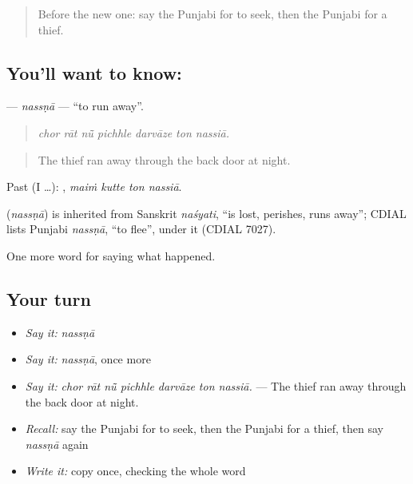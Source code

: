\label{lesson:PA-C311-nassna}



\begin{quote}
Before the new one: say the Punjabi for to seek, then the Punjabi for a thief.
\end{quote}

\subsection*{You'll want to know: }
\textbf{} — \emph{nassṇā} — \textquotedblleft{}to run away\textquotedblright{}.

\begin{quote}
      
\end{quote}

\begin{quote}
\emph{chor rāt nū̃ pichhle darvāze ton nassiā.}
\end{quote}

\begin{quote}
The thief ran away through the back door at night.
\end{quote}

Past (I …):    , \emph{maiṁ kutte ton nassiā}.

\begin{cousinweb}
\textbf{} (\emph{nassṇā}) is inherited from Sanskrit \emph{naśyati}, \textquotedblleft{}is lost, perishes, runs away\textquotedblright{}; CDIAL lists Punjabi \emph{nassṇā}, \textquotedblleft{}to flee\textquotedblright{}, under it (CDIAL 7027).
\end{cousinweb}

\begin{grammarlens}[title={What you've built}]
One more word for saying what happened.
\end{grammarlens}

\subsection*{Your turn}
\begin{itemize}
\raggedright
  \item \emph{Say it:} \emph{nassṇā}
  \item \emph{Say it:} \emph{nassṇā}, once more
  \item \emph{Say it:} \emph{chor rāt nū̃ pichhle darvāze ton nassiā.} — The thief ran away through the back door at night.
  \item \emph{Recall:} say the Punjabi for to seek, then the Punjabi for a thief, then say \emph{nassṇā} again
  \item \emph{Write it:} copy \textbf{} once, checking the whole word
\end{itemize}

